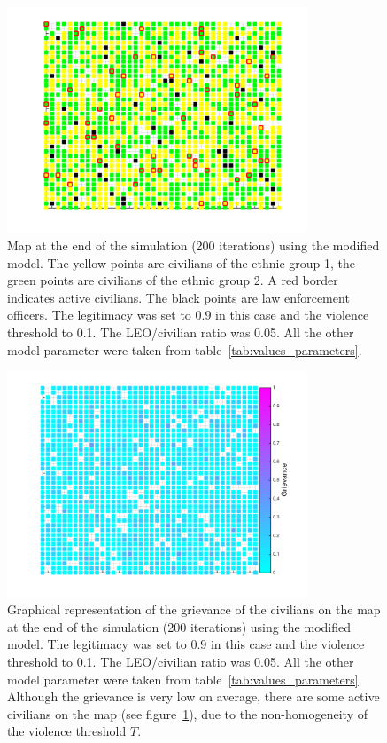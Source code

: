 \documentclass[11pt]{article}
\begin{document}
\begin{figure}[!htbp]
	\centering
		\includegraphics[width=0.8\textwidth]{../../code/modified_model/map_end_L_09.png}
	\caption{Map at the end of the simulation (200 iterations) using the modified model. The yellow points are civilians of the ethnic group 1, the green points are civilians of the ethnic group 2. A red border indicates active civilians. The black points are law enforcement officers. The legitimacy was set to 0.9 in this case and the violence threshold to 0.1. The LEO/civilian ratio was 0.05. All the other model parameter were taken from table~\ref{tab:values_parameters}.}
	\label{fig:map_end_L_09_mod}
\end{figure}
\begin{figure}[!htbp]
	\centering
		\includegraphics[width=0.8\textwidth]{../../code/modified_model/grevance_end_L_09.png}
	\caption{Graphical representation of the grievance of the civilians on the map at the end of the simulation (200 iterations) using the modified model. The legitimacy was set to 0.9 in this case and the violence threshold to 0.1. The LEO/civilian ratio was 0.05. All the other model parameter were taken from table~\ref{tab:values_parameters}. Although the grievance is very low on average, there are some active civilians on the map (see figure~\ref{fig:map_end_L_09_mod}), due to the non-homogeneity of the violence threshold $T$.}
	\label{fig:griev_end_L_09_mod}
\end{figure}
\end{document}
